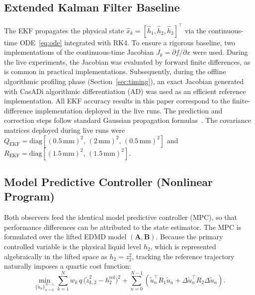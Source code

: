 \documentclass[asi,article,accept,pdftex,moreauthors]{Definitions/mdpi}
\begin{document}
\subsection{Extended Kalman Filter Baseline}
\label{sec:ekf}

The EKF propagates the physical state $\hat{x}_k = [\hat{h}_1,\hat{h}_2,\hat{h}_3]^\top$ via the continuous-time ODE~\eqref{eq:ode} integrated with RK4. {To ensure a rigorous baseline, two implementations of the continuous-time Jacobian $J_k=\partial f/\partial x$ were used. During the live experiments, the Jacobian was evaluated by forward finite differences, as is common in practical implementations. Subsequently, during the offline algorithmic profiling phase (Section~\ref{sec:timing}), an exact Jacobian generated with CasADi algorithmic differentiation (AD) was used as an efficient reference implementation. All EKF accuracy results in this paper correspond to the finite-difference implementation deployed in the live runs.} The prediction and correction steps follow standard Gaussian propagation formulas~\cite{simon2006}. The covariance matrices deployed during live runs were $Q_\mathrm{EKF} = \mathrm{diag}[(0.5\,\mathrm{mm})^2,\,(2\,\mathrm{mm})^2,\,(0.5\,\mathrm{mm})^2]$ and $R_\mathrm{EKF} = \mathrm{diag}[(1.5\,\mathrm{mm})^2,\,(1.5\,\mathrm{mm})^2]$.

\subsection{Model Predictive Controller (Nonlinear Program)}
\label{sec:mpc}

Both observers feed the identical model predictive controller (MPC), so that performance differences can be attributed to the state estimator. {The MPC is formulated over the lifted EDMD model $(\mathbf{A},\mathbf{B})$. Because the primary controlled variable is the physical liquid level $h_2$, which is represented algebraically in the lifted space as $h_2 = z_2^2$, tracking the reference trajectory naturally imposes a quartic cost function:}
\begin{equation}
{\min_{\{\tilde{u}_n\}_{n=0}^{N-1}}
\sum_{k=1}^{N} w_k\,q\,\bigl(\tilde{z}_{k,2}^2 - h_2^\mathrm{ref}\bigr)^2
+ \sum_{n=0}^{N-1}\!\left(\tilde{u}_n^\top R_1\tilde{u}_n + \Delta\tilde{u}_n^\top R_2\Delta\tilde{u}_n\right).}
\label{eq:mpc}
\end{equation}
\end{document}
